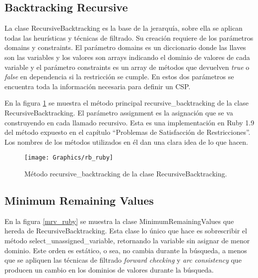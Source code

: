 \subsection{Backtracking Recursive}

La clase \textsf{RecursiveBacktracking} es la base de la jerarqu\'ia, sobre ella se aplican todas las heur\'isticas y t\'ecnicas de filtrado. Su creaci\'on requiere de los par\'ametros \textsf{domains} y \textsf{constraints}. El par\'ametro \textsf{domains} es un diccionario donde las llaves son las variables y los valores son arrays indicando el dominio de valores de cada variable y el par\'ametro \textsf{constraints} es un array de m\'etodos que devuelven \emph{true} o \emph{false} en dependencia si la restricci\'on se cumple. En estos dos par\'ametros se encuentra toda la informaci\'on necesaria para definir un CSP.

En la figura \ref{rb_ruby} se muestra el m\'etodo principal \textsf{recursive\_backtracking} de la clase \textsf{RecursiveBacktracking}. El par\'ametro \textsf{assignment} es la asignaci\'on que se va construyendo en cada llamado recursivo. Esta es una implementaci\'on en Ruby 1.9 del m\'etodo expuesto en el cap\'itulo ``Problemas de Satisfacci\'on de Restricciones''. Los nombres de los m\'etodos utilizados en \'el dan una clara idea de lo que hacen.

\begin{figure}
	\begin{center}
		\texttt{[image: Graphics/rb\_ruby]}
		\caption{M\'etodo \textsf{recursive\_backtracking} de la clase \textsf{RecursiveBacktracking}.}
		\label{rb_ruby}
	\end{center}	
\end{figure}

\subsection{Minimum Remaining Values}

En la figura \ref{mrv_ruby} se muestra la clase \textsf{MinimumRemainingValues} que hereda de \textsf{RecursiveBacktracking}. Esta clase lo \'unico que hace es sobrescribir el m\'etodo \textsf{select\_unassigned\_variable}, retornando la variable sin asignar de menor dominio. Este orden es est\'atico, o sea, no cambia durante la b\'usqueda, a menos que se apliquen las t\'ecnicas de filtrado \emph{forward checking} y \emph{arc consistency} que producen un cambio en los dominios de valores durante la b\'usqueda.

